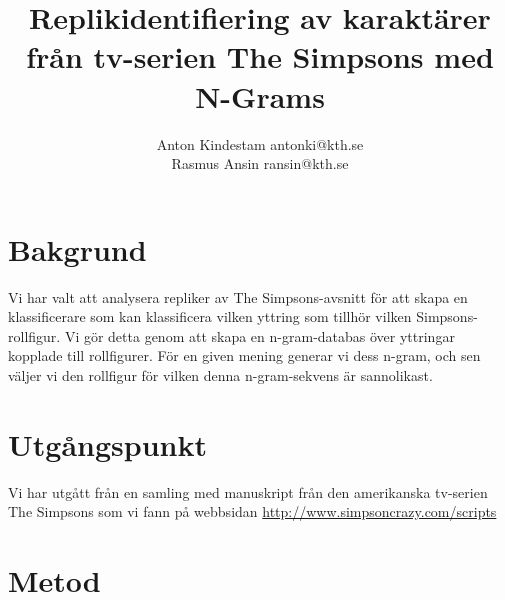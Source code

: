 \documentclass[a4paper]{article}
\author{Anton Kindestam antonki@kth.se\\Rasmus Ansin ransin@kth.se}
\title{Replikidentifiering av karaktärer från tv-serien The Simpsons med N-Grams}
\begin{document}
\maketitle

\section{Bakgrund}
Vi har valt att analysera repliker av The Simpsons-avsnitt för att
skapa en klassificerare som kan klassificera vilken yttring som
tillhör vilken Simpsons-rollfigur. Vi gör detta genom att skapa en
n-gram-databas över yttringar kopplade till rollfigurer. För en given
mening generar vi dess n-gram, och sen väljer vi den rollfigur för
vilken denna n-gram-sekvens är sannolikast.


\section{Utgångspunkt}

Vi har utgått från en samling med manuskript från den amerikanska
tv-serien The Simpsons som vi fann på webbsidan
\url{http://www.simpsoncrazy.com/scripts}

\section{Metod}
\end{document}

